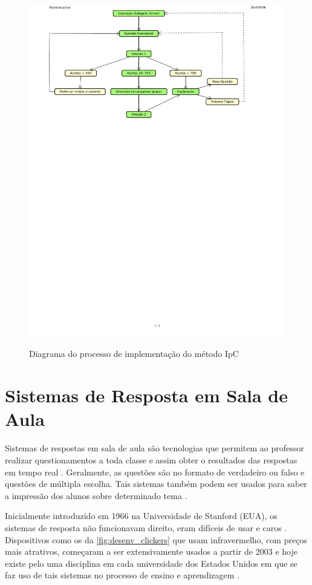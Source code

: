 \begin{figure}[htbp]
  \centering
  \caption{Diagrama do processo de implementação do método IpC}
  \includegraphics[clip, trim=0cm 18cm 3cm .4cm, width=.85\textwidth]{imagens/peer_instruction}
  \label{fig:desen_fluxograma_ipc}
\end{figure}


\section{Sistemas de Resposta em Sala de Aula}
\label{section:sistemas_de_resposta}

Sistemas de respostas em sala de aula são tecnologias que permitem ao professor
realizar questionamentos a toda classe e assim obter o resultados das respostas
em tempo real \cite{Kay2009}. Geralmente, as questões são no formato de verdadeiro ou
falso e questões de múltipla escolha. Tais sistemas também podem ser usados para
saber a impressão dos alunos sobre determinado tema \cite{Fies2006}.

Inicialmente introduzido em 1966 na Universidade de Stanford (EUA), os sistemas
de resposta não funcionavam direito, eram difíceis de usar e caros \cite{Kay2009}. Dispositivos
como os da \autoref{fig:desenv_clickers} que usam infravermelho, com preços mais
atrativos, começaram a ser extensivamente usados a partir de 2003 e hoje existe pelo
uma disciplina em cada universidade dos Estados Unidos em que se faz uso de tais sistemas
no processo de ensino e aprendizagem \cite{Abrahamson2014}.

